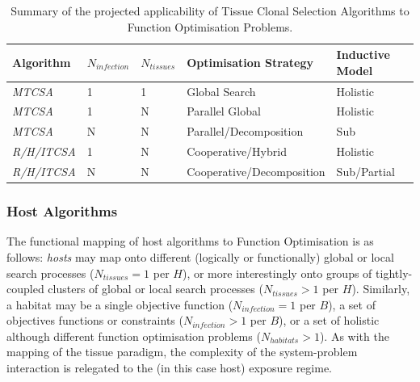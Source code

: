 \begin{table}[htp]
	\centering\small
		\begin{tabular}{lllll}
		\toprule
		\textbf{Algorithm} & \textbf{$N_{infection}$} & \textbf{$N_{tissues}$} & \textbf{Optimisation Strategy} & \textbf{Inductive Model} \\ 
		\toprule
		\emph{MTCSA} & 1 & 1 & Global Search & Holistic \\ 
		\emph{MTCSA} & 1 & N & Parallel Global & Holistic \\ 
		\emph{MTCSA} & N & N & Parallel/Decomposition & Sub \\				
		\emph{R/H/ITCSA} & 1 & N & Cooperative/Hybrid & Holistic \\ 
		\emph{R/H/ITCSA} & N & N & Cooperative/Decomposition & Sub/Partial \\ 
		\bottomrule
		\end{tabular}
	\caption{Summary of the projected applicability of Tissue Clonal Selection Algorithms to Function Optimisation Problems.}
	\label{tab:iidle:function:optimisation:tissue}
\end{table}

%
%
\subsubsection{Host Algorithms}
\label{subsec:iidle:function:optimization:applicability:hosts}
The functional mapping of host algorithms to Function Optimisation is as follows: \emph{hosts} may map onto different (logically or functionally) global or local search processes ($N_{tissues}=1$ per $H$), or more interestingly onto groups of tightly-coupled clusters of global or local search processes ($N_{tissues}>1$ per $H$). Similarly, a habitat may be a single objective function ($N_{infection}=1$ per $B$), a set of objectives functions or constraints ($N_{infection}>1$ per $B$), or a set of holistic although different function optimisation problems ($N_{habitats}>1$). As with the mapping of the tissue paradigm, the complexity of the system-problem interaction is relegated to the (in this case host) exposure regime.

